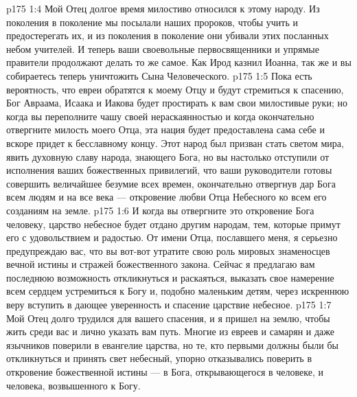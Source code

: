 \vs p175 1:4 Мой Отец долгое время милостиво относился к этому народу. Из поколения в поколение мы посылали наших пророков, чтобы учить и предостерегать их, и из поколения в поколение они убивали этих посланных небом учителей. И теперь ваши своевольные первосвященники и упрямые правители продолжают делать то же самое. Как Ирод казнил Иоанна, так же и вы собираетесь теперь уничтожить Сына Человеческого.
\vs p175 1:5 Пока есть вероятность, что евреи обратятся к моему Отцу и будут стремиться к спасению, Бог Авраама, Исаака и Иакова будет простирать к вам свои милостивые руки; но когда вы переполните чашу своей нераскаянностью и когда окончательно отвергните милость моего Отца, эта нация будет предоставлена сама себе и вскоре придет к бесславному концу. Этот народ был призван стать светом мира, явить духовную славу народа, знающего Бога, но вы настолько отступили от исполнения ваших божественных привилегий, что ваши руководители готовы совершить величайшее безумие всех времен, окончательно отвергнув дар Бога всем людям и на все века --- откровение любви Отца Небесного ко всем его созданиям на земле.
\vs p175 1:6 И когда вы отвергните это откровение Бога человеку, царство небесное будет отдано другим народам, тем, которые примут его с удовольствием и радостью. От имени Отца, пославшего меня, я серьезно предупреждаю вас, что вы вот\hyp{}вот утратите свою роль мировых знаменосцев вечной истины и стражей божественного закона. Сейчас я предлагаю вам последнюю возможность откликнуться и раскаяться, выказать свое намерение всем сердцем устремиться к Богу и, подобно маленьким детям, через искреннюю веру вступить в дающее уверенность и спасение царствие небесное.
\vs p175 1:7 Мой Отец долго трудился для вашего спасения, и я пришел на землю, чтобы жить среди вас и лично указать вам путь. Многие из евреев и самарян и даже язычников поверили в евангелие царства, но те, кто первыми должны были бы откликнуться и принять свет небесный, упорно отказывались поверить в откровение божественной истины --- в Бога, открывающегося в человеке, и человека, возвышенного к Богу.
